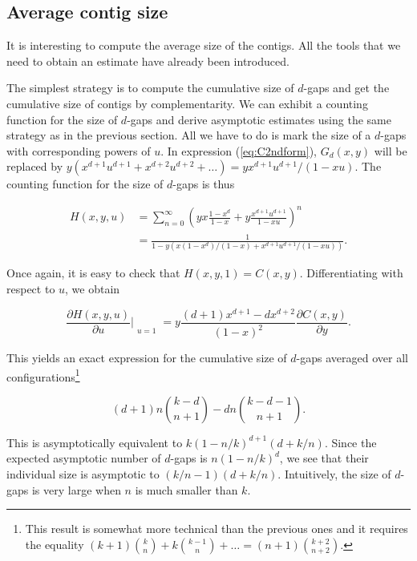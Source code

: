 \documentclass{article}
\begin{document}
\subsection{Average contig size}

It is interesting to compute the average size of the contigs. All the
tools that we need to obtain an estimate have already been introduced.

The simplest strategy is to compute the cumulative size of $d$-gaps and
get the cumulative size of contigs by complementarity. We can exhibit a
counting function for the size of $d$-gaps and derive asymptotic estimates
using the same strategy as in the previous section. All we have to do is
mark the size of a $d$-gaps with corresponding powers of $u$. In
expression (\ref{eq:C2ndform}), $G_d(x,y)$ will be replaced by 
$y(x^{d+1}u^{d+1} + x^{d+2}u^{d+2} + \ldots ) = yx^{d+1}u^{d+1}/(1-xu)$.
The counting function for the size of $d$-gaps is thus

\begin{equation*}
\begin{split}
H(x,y,u) &= \sum_{n=0}^\infty \left(yx\frac{1-x^d}{1-x} +
y\frac{x^{d+1}u^{d+1}}{1-xu}\right)^n \\
&= \frac{1}{1-y \left(x(1-x^d)/(1-x) +
x^{d+1}u^{d+1}/(1-xu) \right)}.
\end{split}
\end{equation*}

Once again, it is easy to check that $H(x,y,1) = C(x,y)$. Differentiating
with respect to $u$, we obtain

\begin{equation*}
\frac{\partial H(x,y,u)}{\partial u}\Bigr|_{\substack{\\u=1}}
= y \frac{(d+1)x^{d+1}-dx^{d+2}}{(1-x)^2} \frac{\partial C(x,y)}
{\partial y}.
\end{equation*}

This yields an exact expression for the cumulative size of $d$-gaps
averaged over all configurations\footnote{This result is somewhat more
technical than the previous ones and it requires the equality
$(k+1){k \choose n} + k{k-1 \choose n} + \ldots = (n+1){k+2
\choose n+2}$.}

\begin{equation}
(d+1)n {k-d \choose n+1} -dn {k-d-1 \choose n+1}.
\end{equation}


This is asymptotically equivalent to $k(1-n/k)^{d+1}(d+k/n)$.  Since the
expected asymptotic number of $d$-gaps is $n(1-n/k)^d$, we see that their
individual size is asymptotic to $(k/n-1)(d+k/n)$. Intuitively, the size
of $d$-gaps is very large when $n$ is much smaller than $k$.
\end{document}
